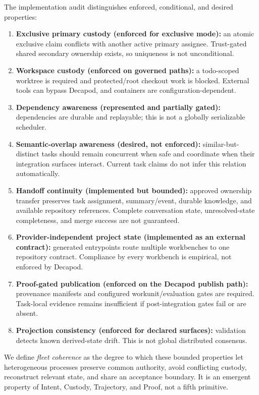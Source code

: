 The implementation audit distinguishes enforced, conditional, and desired properties:
\begin{enumerate}
    \item \textbf{Exclusive primary custody (enforced for exclusive mode):} an atomic exclusive claim conflicts with another active primary assignee. Trust-gated shared secondary ownership exists, so uniqueness is not unconditional.
    \item \textbf{Workspace custody (enforced on governed paths):} a todo-scoped worktree is required and protected/root checkout work is blocked. External tools can bypass Decapod, and containers are configuration-dependent.
    \item \textbf{Dependency awareness (represented and partially gated):} dependencies are durable and replayable; this is not a globally serializable scheduler.
    \item \textbf{Semantic-overlap awareness (desired, not enforced):} similar-but-distinct tasks should remain concurrent when safe and coordinate when their integration surfaces interact. Current task claims do not infer this relation automatically.
    \item \textbf{Handoff continuity (implemented but bounded):} approved ownership transfer preserves task assignment, summary/event, durable knowledge, and available repository references. Complete conversation state, unresolved-state completeness, and merge success are not guaranteed.
    \item \textbf{Provider-independent project state (implemented as an external contract):} generated entrypoints route multiple workbenches to one repository contract. Compliance by every workbench is empirical, not enforced by Decapod.
    \item \textbf{Proof-gated publication (enforced on the Decapod publish path):} provenance manifests and configured workunit/evaluation gates are required. Task-local evidence remains insufficient if post-integration gates fail or are absent.
    \item \textbf{Projection consistency (enforced for declared surfaces):} validation detects known derived-state drift. This is not global distributed consensus.
\end{enumerate}

We define \emph{fleet coherence} as the degree to which these bounded properties let heterogeneous processes preserve common authority, avoid conflicting custody, reconstruct relevant state, and share an acceptance boundary. It is an emergent property of Intent, Custody, Trajectory, and Proof, not a fifth primitive.
